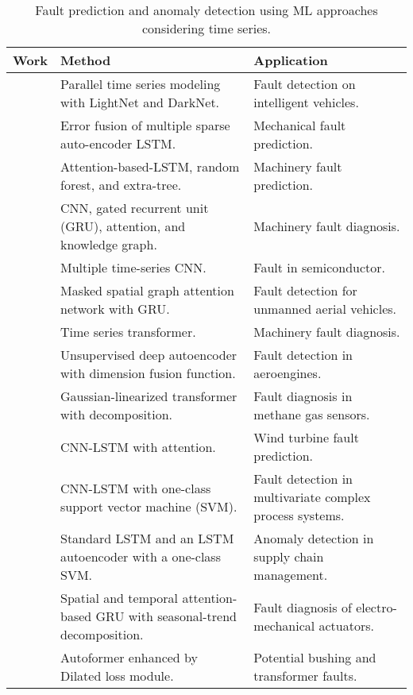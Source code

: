 \begin{table}[]
\small
\caption{Fault prediction and anomaly detection using ML approaches considering time series.}
\label{re_w}
\centering
\begin{tabular}{p{3.6cm}p{6cm}p{5cm}}\hline
Work  & Method & Application\\ \hline
\citep{10356858} & Parallel time series modeling with LightNet and DarkNet. & Fault detection on intelligent vehicles.\\
\citep{guo2021mechanical} & Error fusion of multiple sparse auto-encoder LSTM. & Mechanical fault prediction.\\
\citep{xu2021two} & Attention-based-LSTM, random forest, and extra-tree. & Machinery fault prediction.
\\
\citep{liu2021machinery} & CNN, gated recurrent unit (GRU), attention, and knowledge graph. & Machinery fault diagnosis.\\
\citep{hsu2021multiple} & Multiple time-series CNN. & Fault %
in semiconductor. \\%
\citep{he2022graph} & Masked spatial graph attention network with GRU. & Fault detection for unmanned aerial vehicles.\\
\citep{jin2022time} & Time series transformer. & Machinery fault diagnosis. \\
\citep{chen2023unsupervised} & Unsupervised deep autoencoder with dimension fusion function. & Fault detection in aeroengines. \\
\citep{zhang2023gaussian} & Gaussian-linearized transformer with %
decomposition. & Fault diagnosis in methane gas sensors.\\
\citep{xie2021attention} & CNN-LSTM with attention. & Wind turbine fault prediction.\\
\citep{arunthavanathan2021deep} & CNN-LSTM with one-class support vector machine (SVM). & Fault detection in multivariate complex process systems.\\
\citep{nguyen2021forecasting} & 
Standard LSTM and an LSTM autoencoder with a one-class SVM. & Anomaly detection in supply chain management.\\
\citep{9612196} & Spatial and temporal attention-based GRU with seasonal-trend decomposition. & Fault diagnosis  of electro-mechanical actuators.\\
\citep{10662411} & Autoformer enhanced by Dilated loss module. & Potential bushing and transformer faults.\\

\end{tabular}
\end{table}

